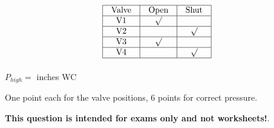 






$$\vbox{\offinterlineskip
\halign{\strut
\vrule \quad\hfil # \ \hfil & 
\vrule \quad\hfil # \ \hfil & 
\vrule \quad\hfil # \ \hfil \vrule \cr
\noalign{\hrule}
%
Valve & Open & Shut \cr
%
\noalign{\hrule}
%
V1 & $\surd$ & \cr
%
\noalign{\hrule}
%
V2 &   & $\surd$ \cr
%
\noalign{\hrule}
%
V3 & $\surd$ & \cr
%
\noalign{\hrule}
%
V4 &   & $\surd$ \cr
%
\noalign{\hrule}
} %
}$$ %

\vskip 10pt

$P_{high} = $  inches WC

\vskip 10pt

One point each for the valve positions, 6 points for correct pressure.







{\bf This question is intended for exams only and not worksheets!}.


